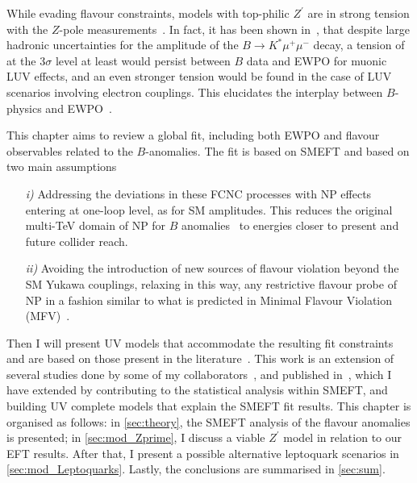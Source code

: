 \par While evading flavour constraints, models with top-philic $Z^\prime$ are in strong tension with the $Z$-pole measurements~\cite{Camargo-Molina:2018cwu,Efrati:2015eaa}. In fact, it has been shown in~\cite{Ciuchini:2019usw}, that despite large hadronic uncertainties for the amplitude of the $B \to K^{*} \mu^{+} \mu^{-}$ decay, a tension of at the 3$\sigma$ level at least would persist between $B$ data and EWPO for muonic LUV effects, and an even stronger tension would be found in the case of LUV scenarios involving electron couplings. This elucidates the interplay between $B$-physics and EWPO~\cite{Bhattacharya:2014wla,Feruglio:2016gvd,Celis:2017doq,Buttazzo:2017ixm,Kumar:2018kmr,Ciuchini:2019usw,Aebischer:2019mlg,Cornella:2019hct}. 
\par This chapter aims to review a global fit, including both EWPO and flavour observables related to the $B$-anomalies. The fit is based on SMEFT and based on two main assumptions
\begin{itemize}
	\item[\textit{i)}] Addressing the deviations in these FCNC processes with NP effects entering at one-loop level, as for SM amplitudes. This reduces the original multi-TeV domain of NP for $B$ anomalies~\cite{DiLuzio:2017chi} to energies closer to present and future collider reach.
	\item[\textit{ii)}] Avoiding the introduction of new sources of flavour violation beyond the SM Yukawa couplings, relaxing in this way, any restrictive flavour probe of NP {in a fashion similar to what is predicted in Minimal Flavour Violation (MFV)~\cite{Buras:2000dm,DAmbrosio:2002vsn,Kagan:2009bn}.}
\end{itemize}
 Then I will present UV models that accommodate the resulting fit constraints and are based on those present in the literature~\cite{Kamenik:2017tnu,Fox:2018ldq,Celis:2017doq}. This work is an extension of several studies done by some of my collaborators~\cite{Ciuchini:2015qxb,Ciuchini:2016weo,Ciuchini:2017mik,Ciuchini:2017gva,Ciuchini:2018xll,Ciuchini:2018anp,Ciuchini:2019usw}, and published in~\cite{Alasfar:2020mne}, which I have extended by contributing to the statistical analysis within SMEFT, and building UV complete models that explain the SMEFT fit results. 
This chapter is organised as follows: in \autoref{sec:theory}, the SMEFT analysis of the flavour anomalies is presented; in \autoref{sec:mod_Zprime}, I discuss a viable $Z^{\prime}$ model in relation to our EFT results. After that, I present a possible alternative leptoquark scenarios in~ \autoref{sec:mod_Leptoquarks}. Lastly, the conclusions are summarised in \autoref{sec:sum}.
